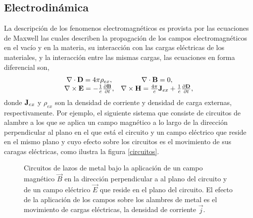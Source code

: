 \documentclass[12pt]{article}
\begin{document}

\subsection{Electrodinámica}
La descripción de los fenomenos electromagnéticos es provista por las
ecuaciones de Maxwell las cuales describen la propagación de los
campos electromagnéticos en el vacío y en la materia, su interacción
con las cargas eléctricas de los materiales, y la interacción entre las
mismas cargas, las ecuaciones en forma diferencial son,
\begin{equation}
  \label{Maxwell-eqs}
  \begin{array}{cc}
    \nabla \cdot {\bf D} = 4\pi \rho_{ex}, & \nabla \cdot {\bf B} =0, \\
    \nabla \times {\bf E} = -\frac{1}{c}\frac{\partial {\bf B}}{\partial t}, &
    \nabla \times {\bf H} = \frac{4\pi}{c}{\bf
      J}_{ex} + \frac{1}{c}\frac{\partial {\bf D}}{\partial t},
  \end{array}
\end{equation}
donde ${\bf J}_{ex}$ y $\rho_{ex}$ son la densidad de corriente y
densidad de carga externas, respectivamente. Por ejemplo, el siguiente
sistema que consiste de circuitos de alambre a los que se aplica un
campo magnético a lo largo de la dirección perpendicular al plano en
el que está el circuito y un campo eléctrico que reside en el mismo
plano y cuyo efecto sobre los circuitos es el movimiento de sus
caragas eléctricas, como ilustra la figura \ref{circuitos}.
\begin{figure}
  \centering
  

  \caption{Circuitos de lazos de metal bajo la aplicación de un campo
    magnético $\vec{B}$ en la dirección perpendicular a al plano del
    circuito y de un campo eléctrico $\vec{E}$ que reside en el plano
    del circuito. El efecto de la aplicación de los campos sobre los
    alambres de metal es el movimiento de cargas eléctricas, la
    densidad de corriente $\vec{j}$. }
\label{Circuitos}

\end{figure}
\end{document}
